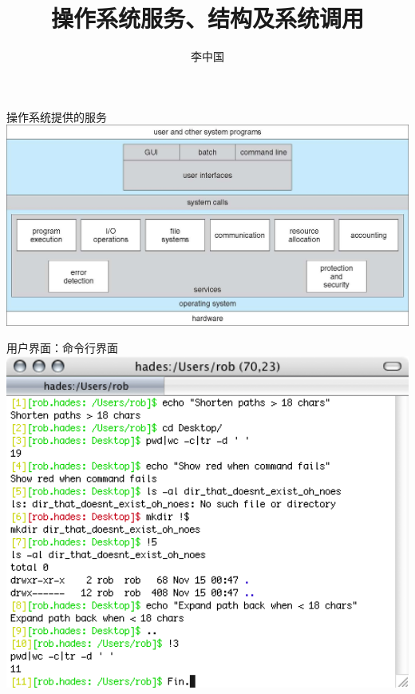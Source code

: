 \documentclass[xcolor=svgnames]{beamer}
\begin{document}
\begin{CJK*}{UTF8}{gbsn}


\title{操作系统服务、结构及系统调用}

\author{李中国}
\date{}

\begin{frame}
  \titlepage
\end{frame}


\begin{frame}{操作系统提供的服务}
\includegraphics[width=1.0\textwidth]{services.jpg}
\end{frame}

\begin{frame}{用户界面：命令行界面}
\includegraphics[width=1.0\textwidth]{bash.png}
\end{frame}


\end{CJK*}
\end{document}
